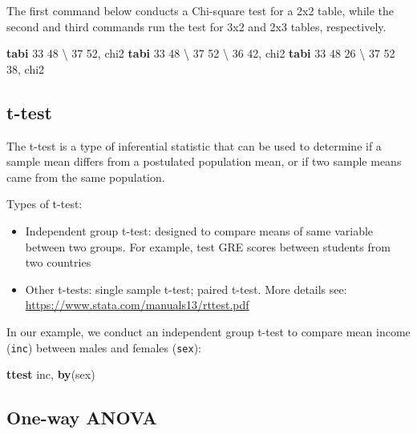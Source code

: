 \documentclass[
]{book}
\newenvironment{Shaded}{\begin{snugshade}}{\end{snugshade}}
\newcommand{\FunctionTok}[1]{\textcolor[rgb]{0.00,0.00,0.00}{#1}}
\newcommand{\KeywordTok}[1]{\textcolor[rgb]{0.13,0.29,0.53}{\textbf{#1}}}
\newcommand{\NormalTok}[1]{#1}
\providecommand{\tightlist}{%
  \setlength{\itemsep}{0pt}\setlength{\parskip}{0pt}}
\begin{document}
The first command below conducts a Chi-square test for a 2x2 table, while the second and third commands run the test for 3x2 and 2x3 tables, respectively.

\begin{Shaded}
\begin{Highlighting}[]
\KeywordTok{tabi}\NormalTok{ 33 48 \textbackslash{} 37 52, }\FunctionTok{chi2}
\KeywordTok{tabi}\NormalTok{ 33 48 \textbackslash{} 37 52 \textbackslash{} 36 42, }\FunctionTok{chi2}
\KeywordTok{tabi}\NormalTok{ 33 48 26 \textbackslash{} 37 52 38, }\FunctionTok{chi2}
\end{Highlighting}
\end{Shaded}

\hypertarget{t-test}{%
\subsection{t-test}\label{t-test}}

The t-test is a type of inferential statistic that can be used to determine if a sample mean differs from a postulated population mean, or if two sample means came from the same population.

Types of t-test:

\begin{itemize}
\tightlist
\item
  Independent group t-test: designed to compare means of same variable between two groups. For example, test GRE scores between students from two countries
\item
  Other t-tests: single sample t-test; paired t-test. More details see: \url{https://www.stata.com/manuals13/rttest.pdf}
\end{itemize}

In our example, we conduct an independent group t-test to compare mean income (\texttt{inc}) between males and females (\texttt{sex}):

\begin{Shaded}
\begin{Highlighting}[]
\KeywordTok{ttest}\NormalTok{ inc, }\KeywordTok{by}\NormalTok{(sex)}
\end{Highlighting}
\end{Shaded}

\hypertarget{one-way-anova}{%
\subsection{One-way ANOVA}\label{one-way-anova}}
\end{document}
